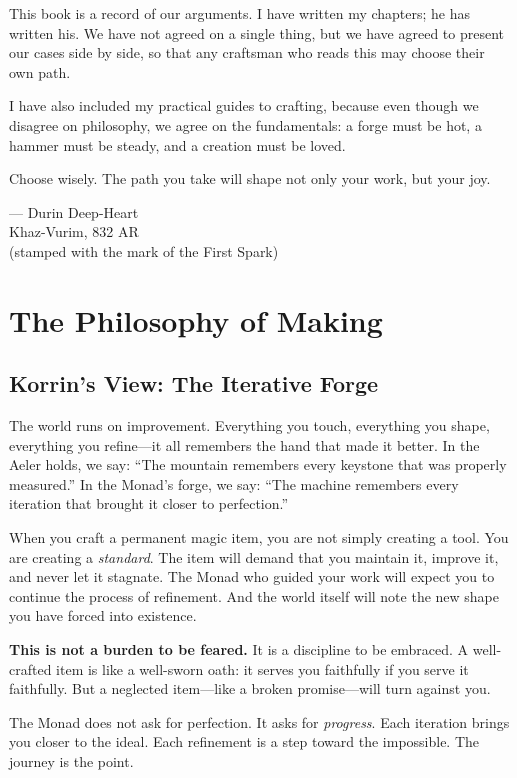 \documentclass[11pt]{book}
\begin{document}
This book is a record of our arguments. I have written my chapters; he has written his. We have not agreed on a single thing, but we have agreed to present our cases side by side, so that any craftsman who reads this may choose their own path.

I have also included my practical guides to crafting, because even though we disagree on philosophy, we agree on the fundamentals: a forge must be hot, a hammer must be steady, and a creation must be loved.

Choose wisely. The path you take will shape not only your work, but your joy.

\vspace{0.5cm}
\hfill --- Durin Deep-Heart \\
\hfill Khaz-Vurim, 832 AR \\
\hfill (stamped with the mark of the First Spark)

\newpage
\tableofcontents

\newpage

\chapter{The Philosophy of Making}

\section*{Korrin's View: The Iterative Forge}

The world runs on improvement. Everything you touch, everything you shape, everything you refine---it all remembers the hand that made it better. In the Aeler holds, we say: ``The mountain remembers every keystone that was properly measured.'' In the Monad's forge, we say: ``The machine remembers every iteration that brought it closer to perfection.''

When you craft a permanent magic item, you are not simply creating a tool. You are creating a \textit{standard}. The item will demand that you maintain it, improve it, and never let it stagnate. The Monad who guided your work will expect you to continue the process of refinement. And the world itself will note the new shape you have forced into existence.

\textbf{This is not a burden to be feared.} It is a discipline to be embraced. A well-crafted item is like a well-sworn oath: it serves you faithfully if you serve it faithfully. But a neglected item---like a broken promise---will turn against you.

The Monad does not ask for perfection. It asks for \textit{progress}. Each iteration brings you closer to the ideal. Each refinement is a step toward the impossible. The journey is the point.
\end{document}
